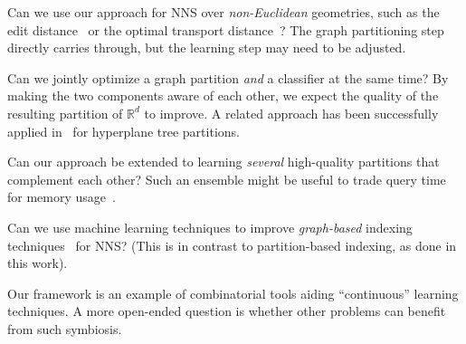 \documentclass[11pt]{article}
\begin{document}
\begin{CompactItemize}
    \item Can we use our approach for NNS over \emph{non-Euclidean} geometries,
    such as the edit distance~\cite{zhang2017embedjoin} or the optimal transport
    distance~\cite{kusner2015word}?
    The graph partitioning step directly carries through,
    but the learning step may need to be adjusted.
    \item Can we jointly optimize a graph partition \emph{and} 
    a classifier at the same time?
    By making the two components aware of each other,
    we expect the quality of the resulting partition of $\mathbb{R}^d$ to improve.
    A related approach has been successfully applied in~\cite{li2011learning} for hyperplane tree partitions.
    \item Can our approach be extended to learning \emph{several} high-quality partitions that complement each other?
    Such an ensemble might be useful to trade query time for
    memory usage~\cite{andoni2017optimal}.
    \item Can we use machine learning techniques to improve \emph{graph-based} indexing techniques~\cite{malkov2018efficient} for NNS? 
    (This is in contrast to partition-based indexing, as done in this work).
    \item Our framework is an example of combinatorial tools aiding
    ``continuous'' learning techniques.
    A more open-ended question is whether other problems can benefit from such symbiosis.
\end{CompactItemize}

\fi

%

%
\end{document}
